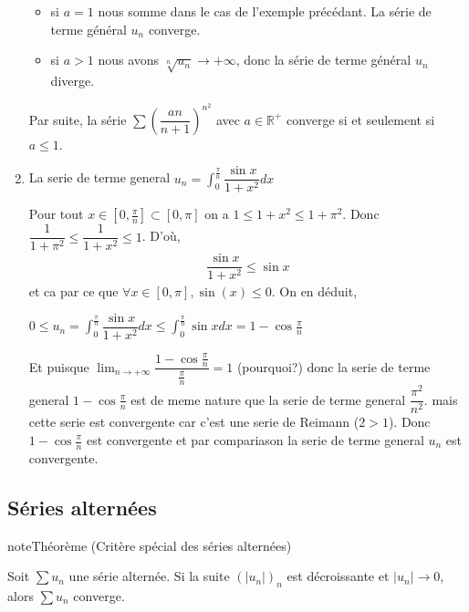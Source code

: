 \documentclass[letterpaper,10pt,french]{sphinxmanual}
\begin{document}
\begin{enumerate}
\begin{itemize}
\item {} 
\sphinxAtStartPar
si \(a=1\) nous somme dans le cas de l’exemple précédant. La série de terme général \(u_n\) converge.

\item {} 
\sphinxAtStartPar
si \(a>1\) nous avons \(\sqrt[n]{u_n} \to +\infty\), donc la série de terme général \(u_n\) diverge.

\end{itemize}

\sphinxAtStartPar
Par suite, la série \(\sum (\dfrac{an}{n+1})^{n^2}\) avec \(a\in \mathbb R^+\) converge si et seulement si \(a \leq 1\).

\item {} 
\sphinxAtStartPar
La serie de terme general \(u_n = \int_0^{\frac{\pi}{n}} \dfrac{\sin x}{1+x^2}dx\)

\sphinxAtStartPar
Pour tout \(x \in [0, \frac{\pi}{n}] \subset [0, \pi]\) on a \(1 \leq 1+x^2 \leq 1+ \pi^2\). Donc \(\dfrac{1}{1+\pi^2} \leq \dfrac{1}{1+x^2} \leq 1\). D’où,
\begin{equation*}
\begin{split}
    \dfrac{\sin x}{1+x^2} \leq \sin x
    \end{split}
\end{equation*}
\sphinxAtStartPar
et ca par ce que \(\forall x \in [0, \pi], \sin(x)\leq 0\). On en déduit,

\sphinxAtStartPar
\(0 \leq u_n =  \int_0^{\frac{\pi}{n}} \dfrac{\sin x}{1+x^2}dx \leq  \int_0^{\frac{\pi}{n}} \sin x dx = 1- \cos \frac{\pi}{n}\)

\sphinxAtStartPar
Et puisque \(\lim_{n\to +\infty} \dfrac{1- \cos \frac{\pi}{n}}{\frac{\pi}{n}} = 1\) (pourquoi?) donc la serie de terme general \(1- \cos \frac{\pi}{n}\) est de meme nature que la serie de terme general \(\dfrac{\pi^2}{n^2}\). mais cette serie est convergente car c’est une serie de Reimann (\(2>1\)). Donc \(1- \cos \frac{\pi}{n}\) est convergente et par compariason la serie de terme general \(u_n\) est convergente.

\end{enumerate}


\subsection{Séries alternées}
\label{\detokenize{series:series-alternees}}
\begin{sphinxadmonition}{note}{Théorème (Critère spécial des séries alternées)}

\sphinxAtStartPar
Soit \(\sum u_n\) une série alternée. Si la suite \((|u_n|)_n\) est décroissante et \(|u_n| \to 0\), alors \(\sum u_n\) converge.
\end{sphinxadmonition}
\end{document}
